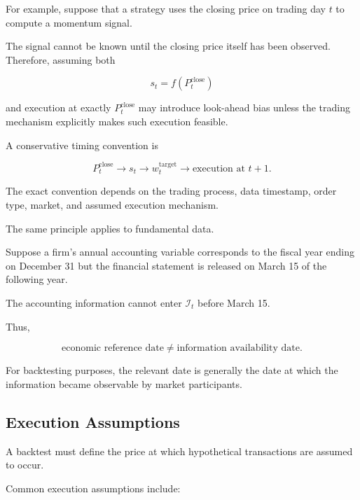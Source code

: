\documentclass[11pt,a4paper]{article}
\begin{document}
For example, suppose that a strategy uses the closing price on trading day $t$
to compute a momentum signal.

The signal cannot be known until the closing price itself has been observed.
Therefore, assuming both

\begin{equation}
s_t
=
f(P_t^{\mathrm{close}})
\end{equation}

and execution at exactly $P_t^{\mathrm{close}}$ may introduce look-ahead bias
unless the trading mechanism explicitly makes such execution feasible.

A conservative timing convention is

\begin{equation}
\boxed{
P_t^{\mathrm{close}}
\rightarrow
s_t
\rightarrow
w_t^{\mathrm{target}}
\rightarrow
\text{execution at } t+1.
}
\end{equation}

The exact convention depends on the trading process, data timestamp, order type,
market, and assumed execution mechanism.

The same principle applies to fundamental data.

Suppose a firm's annual accounting variable corresponds to the fiscal year
ending on December 31 but the financial statement is released on March 15 of
the following year.

The accounting information cannot enter $\mathcal{I}_t$ before March 15.

Thus,

\begin{equation}
\boxed{
\text{economic reference date}
\neq
\text{information availability date}.
}
\end{equation}

For backtesting purposes, the relevant date is generally the date at which the
information became observable by market participants.


\subsection{Execution Assumptions}
\label{subsec:execution}

A backtest must define the price at which hypothetical transactions are assumed
to occur.

Common execution assumptions include:
\end{document}
